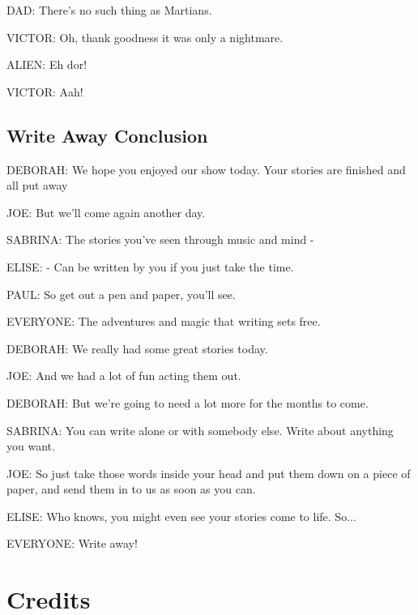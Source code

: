 DAD:
There's no such thing as Martians.

VICTOR:
Oh, thank goodness it was only a nightmare.

ALIEN:
Eh dor!

VICTOR:
Aah!

\subsection{Write Away Conclusion}
DEBORAH:
We hope you enjoyed our show today.
Your stories are finished and all put away

JOE:
But we'll come again another day.

SABRINA:
The stories you've seen through music and mind -

ELISE:
- Can be written by you if you just take the time.

PAUL:
So get out a pen and paper, you'll see.

EVERYONE:
The adventures and magic that writing sets free.

DEBORAH:
We really had some great stories today.

JOE:
And we had a lot of fun acting them out.

DEBORAH:
But we're going to need a lot more for the months to come.

SABRINA:
You can write alone or with somebody else. Write about anything you want.

JOE:
So just take those words inside your head and put them down on a piece of paper, and send them in to us as soon as you can.

ELISE:
Who knows, you might even see your stories come to life. So...

EVERYONE:
Write away!

\section{Credits}